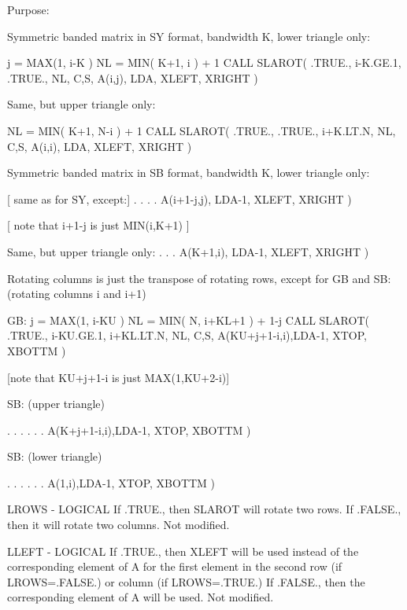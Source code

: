 \begin{DoxyParagraph}{Purpose\+: }
\begin{DoxyVerb}

      Symmetric banded matrix in SY format, bandwidth K,
      lower triangle only:

              j = MAX(1, i-K )
              NL = MIN( K+1, i ) + 1
              CALL SLAROT( .TRUE., i-K.GE.1, .TRUE., NL, C,S,
                      A(i,j), LDA, XLEFT, XRIGHT )

      Same, but upper triangle only:

              NL = MIN( K+1, N-i ) + 1
              CALL SLAROT( .TRUE., .TRUE., i+K.LT.N, NL, C,S,
                      A(i,i), LDA, XLEFT, XRIGHT )

      Symmetric banded matrix in SB format, bandwidth K,
      lower triangle only:

              [ same as for SY, except:]
                  . . . .
                      A(i+1-j,j), LDA-1, XLEFT, XRIGHT )

              [ note that i+1-j is just MIN(i,K+1) ]

      Same, but upper triangle only:
                   . . .
                      A(K+1,i), LDA-1, XLEFT, XRIGHT )

      Rotating columns is just the transpose of rotating rows, except
      for GB and SB: (rotating columns i and i+1)

      GB:
              j = MAX(1, i-KU )
              NL = MIN( N, i+KL+1 ) + 1-j
              CALL SLAROT( .TRUE., i-KU.GE.1, i+KL.LT.N, NL, C,S,
                      A(KU+j+1-i,i),LDA-1, XTOP, XBOTTM )

              [note that KU+j+1-i is just MAX(1,KU+2-i)]

      SB: (upper triangle)

                   . . . . . .
                      A(K+j+1-i,i),LDA-1, XTOP, XBOTTM )

      SB: (lower triangle)

                   . . . . . .
                      A(1,i),LDA-1, XTOP, XBOTTM )\end{DoxyVerb}
 \begin{DoxyVerb}  LROWS  - LOGICAL
           If .TRUE., then SLAROT will rotate two rows.  If .FALSE.,
           then it will rotate two columns.
           Not modified.

  LLEFT  - LOGICAL
           If .TRUE., then XLEFT will be used instead of the
           corresponding element of A for the first element in the
           second row (if LROWS=.FALSE.) or column (if LROWS=.TRUE.)
           If .FALSE., then the corresponding element of A will be
           used.
           Not modified.


\end{DoxyVerb}
\end{DoxyParagraph}
